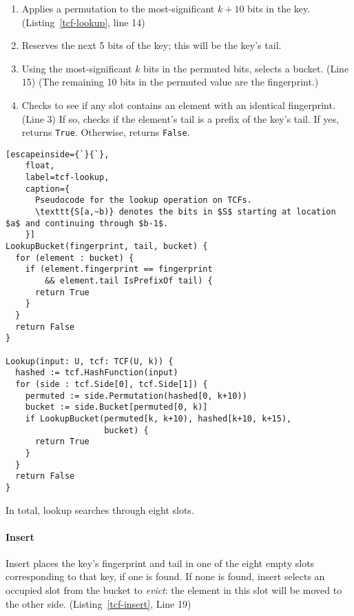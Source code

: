 \documentclass[sigconf]{acmart}
\begin{document}
\begin{enumerate}
\item Applies a permutation to the most-significant $k+10$ bits in the key. (Listing~\ref{tcf-lookup}, line 14)
\item Reserves the next 5 bits of the key; this will be the key's tail.
\item Using the most-significant $k$ bits in the permuted bits, selects a bucket. (Line 15)
(The remaining 10 bits in the permuted value are the fingerprint.)
\item Checks to see if any slot contains an element with an identical fingerprint. (Line 3)
If so, checks if the element's tail is a prefix of the key's tail.
If yes, returns \verb|True|.
Otherwise, returns \verb|False|.
\end{enumerate}


\begin{lstlisting}[escapeinside={`}{`},
    float,
    label=tcf-lookup,
    caption={
      Pseudocode for the lookup operation on TCFs.
      \texttt{S[a,~b)} denotes the bits in $S$ starting at location $a$ and continuing through $b-1$.
    }]
LookupBucket(fingerprint, tail, bucket) {
  for (element : bucket) {
    if (element.fingerprint == fingerprint
        && element.tail IsPrefixOf tail) {
      return True
    }
  }
  return False
}

Lookup(input: U, tcf: TCF(U, k)) {
  hashed := tcf.HashFunction(input)
  for (side : tcf.Side[0], tcf.Side[1]) {
    permuted := side.Permutation(hashed[0, k+10))
    bucket := side.Bucket[permuted[0, k)]
    if LookupBucket(permuted[k, k+10), hashed[k+10, k+15),
                    bucket) {
      return True
    }
  }
  return False
}
\end{lstlisting}


In total, lookup searches through eight slots.

\paragraph{Insert}
Insert places the key's fingerprint and tail in one of the eight empty slots corresponding to that key, if one is found.
If none is found, insert selects an occupied slot from the bucket to {\em evict}: the element in this slot will be moved to the other side. (Listing~\ref{tcf-insert}, Line 19)
\end{document}
